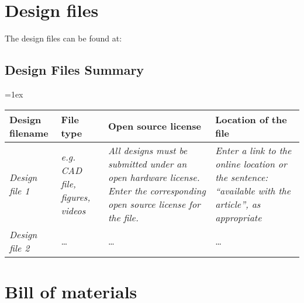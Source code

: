 \documentclass[11pt, letterpaper]{article}
\begin{document}
\section{Design files}

The design files can be found at: 

\subsection{Design Files Summary}

\tabulinesep=1ex
\begin{tabu} to \linewidth {|X|X|X[1.5,1]|X[1.5,1]|}
\hline
\textbf{Design filename} & \textbf{File type} & \textbf{Open source license} & \textbf{Location of the file} \\\hline
\textit{Design file 1} & \textit{e.g. CAD file, figures, videos} & \textit{All designs must be submitted under an open hardware license. Enter the corresponding open source license for the file.} & \textit{Enter a link to the online location or the sentence: ``available with the article'', as appropriate}  \\\hline
\textit{Design file 2} & \dots & \dots & \dots \\\hline

\end{tabu}



\section{Bill of materials}
\end{document}
